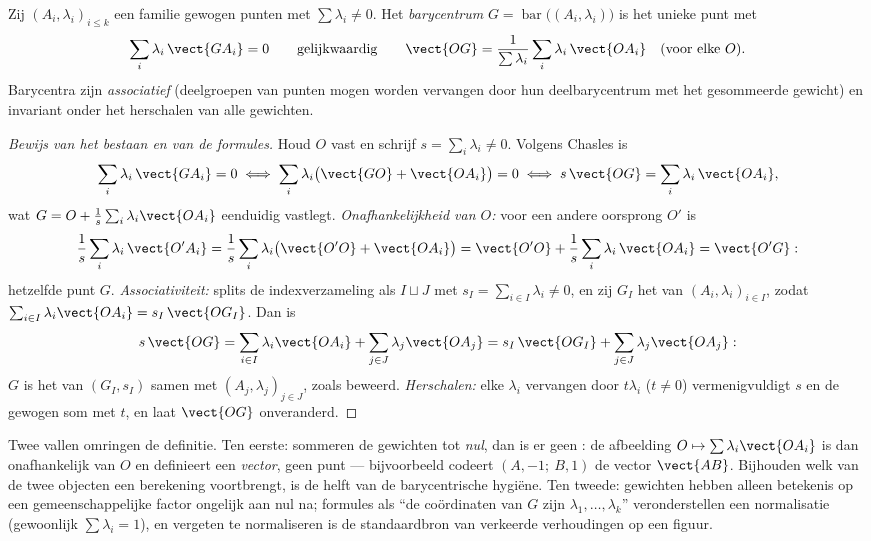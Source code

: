 \begin{definition}[Barycentrum]\label{def:b2:affine:barycenter}
Zij $(A_i, \lambda_i)_{i \leq k}$ een familie gewogen punten met
$\sum\lambda_i \neq 0$. Het \emph{barycentrum}
$G = \operatorname{bar}\bigl((A_i, \lambda_i)\bigr)$ is het unieke
punt met
\[
\sum_i \lambda_i\, \vect{GA_i} = 0
\qquad\text{gelijkwaardig}\qquad
\vect{OG} = \frac{1}{\sum\lambda_i}\sum_i \lambda_i\,\vect{OA_i}
\quad (\text{voor elke } O).
\]
Barycentra zijn \emph{associatief} (deelgroepen van punten mogen
worden vervangen door hun deelbarycentrum met het gesommeerde
gewicht) en invariant onder het herschalen van alle gewichten.
\end{definition}

\begin{proof}[Bewijs van het bestaan en van de formules]
Houd $O$ vast en schrijf $s = \sum_i\lambda_i \neq 0$. Volgens
Chasles is
\[
\sum_i\lambda_i\,\vect{GA_i} = 0
\iff \sum_i\lambda_i\bigl(\vect{GO} + \vect{OA_i}\bigr) = 0
\iff s\,\vect{OG} = \sum_i\lambda_i\,\vect{OA_i},
\]
wat $G = O + \frac1s\sum_i\lambda_i\vect{OA_i}$ eenduidig
vastlegt. \emph{Onafhankelijkheid van $O$:} voor een andere
oorsprong $O'$ is
\[
\frac1s\sum_i\lambda_i\,\vect{O'A_i}
= \frac1s\sum_i\lambda_i\bigl(\vect{O'O} + \vect{OA_i}\bigr)
= \vect{O'O} + \frac1s\sum_i\lambda_i\,\vect{OA_i}
= \vect{O'G} :
\]
hetzelfde punt $G$. \emph{Associativiteit:} splits de
indexverzameling als $I \sqcup J$ met $s_I = \sum_{i\in I}\lambda_i
\neq 0$, en zij $G_I$ het  van $(A_i, \lambda_i)_{i\in
I}$, zodat $\sum_{i\in I}\lambda_i\vect{OA_i} = s_I\,\vect{OG_I}$.
Dan is
\[
s\,\vect{OG}
= \sum_{i\in I}\lambda_i\vect{OA_i} +
\sum_{j\in J}\lambda_j\vect{OA_j}
= s_I\,\vect{OG_I} + \sum_{j\in J}\lambda_j\vect{OA_j} :
\]
$G$ is het  van $(G_I, s_I)$ samen met $(A_j,
\lambda_j)_{j\in J}$, zoals beweerd. \emph{Herschalen:} elke
$\lambda_i$ vervangen door $t\lambda_i$ ($t \neq 0$)
vermenigvuldigt $s$ en de gewogen som met $t$, en laat $\vect{OG}$
onveranderd.
\end{proof}

\begin{remark}
Twee vallen omringen de definitie. Ten eerste: sommeren de
gewichten tot \emph{nul}, dan is er geen : de afbeelding
$O \mapsto \sum\lambda_i\vect{OA_i}$ is dan onafhankelijk van $O$
en definieert een \emph{vector}, geen punt --- bijvoorbeeld codeert
$(A, -1;\ B, 1)$ de vector $\vect{AB}$. Bijhouden welk van de twee
objecten een berekening voortbrengt, is de helft van de
barycentrische hygiëne. Ten tweede: gewichten hebben alleen
betekenis op een gemeenschappelijke factor ongelijk aan nul na;
formules als ``de coördinaten van $G$ zijn $\lambda_1, \dots,
\lambda_k$'' veronderstellen een normalisatie (gewoonlijk
$\sum\lambda_i = 1$), en vergeten te normaliseren is de
standaardbron van verkeerde verhoudingen op een figuur.
\end{remark}

